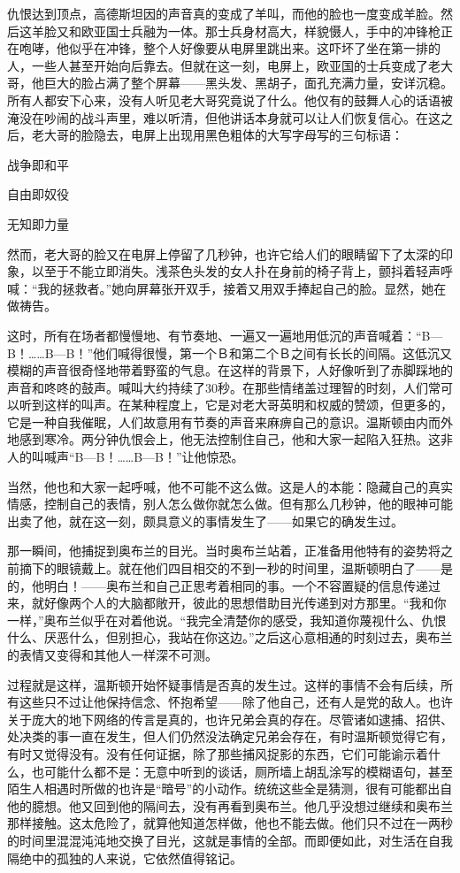 仇恨达到顶点，高德斯坦因的声音真的变成了羊叫，而他的脸也一度变成羊脸。然后这羊脸又和欧亚国士兵融为一体。那士兵身材高大，样貌慑人，手中的冲锋枪正在咆哮，他似乎在冲锋，整个人好像要从电屏里跳出来。这吓坏了坐在第一排的人，一些人甚至开始向后靠去。但就在这一刻，电屏上，欧亚国的士兵变成了老大哥，他巨大的脸占满了整个屏幕------黑头发、黑胡子，面孔充满力量，安详沉稳。所有人都安下心来，没有人听见老大哥究竟说了什么。他仅有的鼓舞人心的话语被淹没在吵闹的战斗声里，难以听清，但他讲话本身就可以让人们恢复信心。在这之后，老大哥的脸隐去，电屏上出现用黑色粗体的大写字母写的三句标语：

战争即和平

自由即奴役

无知即力量

然而，老大哥的脸又在电屏上停留了几秒钟，也许它给人们的眼睛留下了太深的印象，以至于不能立即消失。浅茶色头发的女人扑在身前的椅子背上，颤抖着轻声呼喊：``我的拯救者。''她向屏幕张开双手，接着又用双手捧起自己的脸。显然，她在做祷告。

这时，所有在场者都慢慢地、有节奏地、一遍又一遍地用低沉的声音喊着：``B---B！\ldots\ldots B---B！''他们喊得很慢，第一个Ｂ和第二个Ｂ之间有长长的间隔。这低沉又模糊的声音很奇怪地带着野蛮的气息。在这样的背景下，人好像听到了赤脚踩地的声音和咚咚的鼓声。喊叫大约持续了30秒。在那些情绪盖过理智的时刻，人们常可以听到这样的叫声。在某种程度上，它是对老大哥英明和权威的赞颂，但更多的，它是一种自我催眠，人们故意用有节奏的声音来麻痹自己的意识。温斯顿由内而外地感到寒冷。两分钟仇恨会上，他无法控制住自己，他和大家一起陷入狂热。这非人的叫喊声``B---B！\ldots\ldots B---B！''让他惊恐。

当然，他也和大家一起呼喊，他不可能不这么做。这是人的本能：隐藏自己的真实情感，控制自己的表情，别人怎么做你就怎么做。但有那么几秒钟，他的眼神可能出卖了他，就在这一刻，颇具意义的事情发生了------如果它的确发生过。

那一瞬间，他捕捉到奥布兰的目光。当时奥布兰站着，正准备用他特有的姿势将之前摘下的眼镜戴上。就在他们四目相交的不到一秒的时间里，温斯顿明白了------是的，他明白！------奥布兰和自己正思考着相同的事。一个不容置疑的信息传递过来，就好像两个人的大脑都敞开，彼此的思想借助目光传递到对方那里。``我和你一样，''奥布兰似乎在对着他说。``我完全清楚你的感受，我知道你蔑视什么、仇恨什么、厌恶什么，但别担心，我站在你这边。''之后这心意相通的时刻过去，奥布兰的表情又变得和其他人一样深不可测。

过程就是这样，温斯顿开始怀疑事情是否真的发生过。这样的事情不会有后续，所有这些只不过让他保持信念、怀抱希望------除了他自己，还有人是党的敌人。也许关于庞大的地下网络的传言是真的，也许兄弟会真的存在。尽管诸如逮捕、招供、处决类的事一直在发生，但人们仍然没法确定兄弟会存在，有时温斯顿觉得它有，有时又觉得没有。没有任何证据，除了那些捕风捉影的东西，它们可能谕示着什么，也可能什么都不是：无意中听到的谈话，厕所墙上胡乱涂写的模糊语句，甚至陌生人相遇时所做的也许是``暗号''的小动作。统统这些全是猜测，很有可能都出自他的臆想。他又回到他的隔间去，没有再看到奥布兰。他几乎没想过继续和奥布兰那样接触。这太危险了，就算他知道怎样做，他也不能去做。他们只不过在一两秒的时间里混混沌沌地交换了目光，这就是事情的全部。而即便如此，对生活在自我隔绝中的孤独的人来说，它依然值得铭记。

